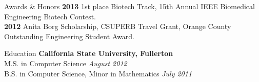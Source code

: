 \documentclass{resume} %
\begin{document}

\begin{rSection}{Awards \& Honors}
{\bf 2013} 1st place Biotech Track, 15th Annual IEEE Biomedical Engineering Biotech Contest. \\
{\bf 2012} Anita Borg Scholarship, CSUPERB Travel Grant, Orange County Outstanding Engineering Student Award. \\
\end{rSection}


\begin{rSection}{Education}
{\bf California State University, Fullerton}  \\ 
M.S. in Computer Science \hfill {\em August 2012}\\
B.S. in Computer Science, Minor in Mathematics  \hfill {\em July 2011}\\
\end{rSection}






\end{document}
